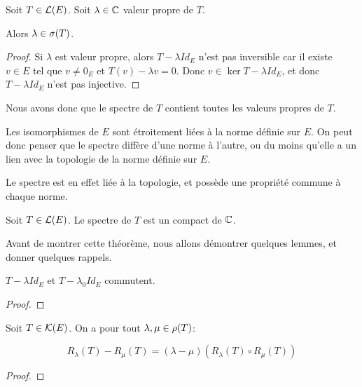 \begin{proposition}
	Soit $T \in \mathcal{L}(E)$.
	Soit $\lambda \in \mathbb{C}$ valeur propre de $T$.

	Alors $\lambda \in \sigma(T)$.
\end{proposition}

\begin{proof}
	Si $\lambda$ est valeur propre, alors $T - \lambda Id_{E}$ n'est pas
	inversible car il existe $v \in E$ tel que $v \neq 0_{E}$ et $T(v) - \lambda
	v = 0$. Donc $v \in \ker{T - \lambda Id_{E}}$, et donc $T - \lambda Id_{E}$
	n'est pas injective.
\end{proof}

Nous avons donc que le spectre de $T$ contient toutes les valeurs propres de
$T$.

Les isomorphismes de $E$ sont étroitement liées à la norme définie sur $E$. On
peut donc penser que le spectre diffère d'une norme à l'autre, ou du moins
qu'elle a un lien avec la topologie de la norme définie sur $E$.

Le spectre est en effet liée à la topologie, et possède une propriété commune à
chaque norme.

\begin{theorem}
	\label{thm:spectrum_compact}
	Soit $T \in \mathcal{L}(E)$.
	Le spectre de $T$ est un compact de $\mathbb{C}$.
\end{theorem}

Avant de montrer cette théorème, nous allons démontrer quelques lemmes, et
donner quelques rappels.

\begin{lemma}
	$T - \lambda Id_{E}$ et $T - \lambda_{0} Id_{E}$ commutent.
\end{lemma}

\begin{proof}
	
\end{proof}

\begin{proposition} 
	\label{prop:resolvante_identity}
	Soit $T \in \mathcal{K}(E)$.
	On a pour tout $\lambda, \mu \in \rho(T)$:

	\begin{equation}
		R_{\lambda}(T) - R_{\mu}(T) = (\lambda - \mu) (R_{\lambda}(T) \circ
		R_{\mu}(T))
	\end{equation}
\end{proposition}

\begin{proof}

\end{proof}

